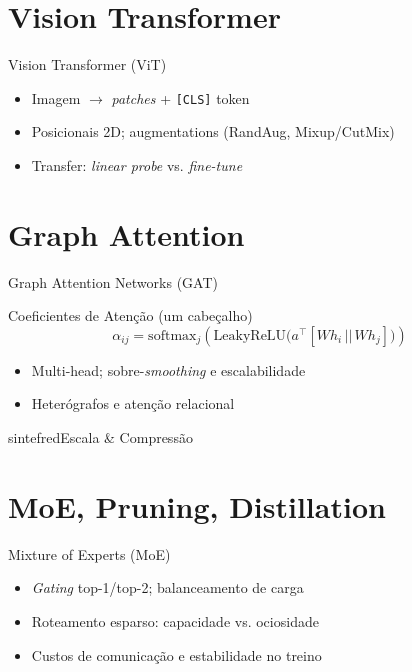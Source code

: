 \documentclass{beamer}
\begin{document}
\section{Vision Transformer}
\begin{frame}{Vision Transformer (ViT)}
\begin{itemize}[<+->]
  \item Imagem $\rightarrow$ \textit{patches} + \texttt{[CLS]} token
  \item Posicionais 2D; augmentations (RandAug, Mixup/CutMix)
  \item Transfer: \textit{linear probe} vs. \textit{fine-tune}
\end{itemize}
\end{frame}

\section{Graph Attention}
\begin{frame}{Graph Attention Networks (GAT)}
\begin{block}{Coeficientes de Atenção (um cabeçalho)}
\small
\[
\alpha_{ij}=\mathrm{softmax}_j\!\left(\mathrm{LeakyReLU}\!\big(a^\top[Wh_i \,||\, Wh_j]\big)\right)
\]
\end{block}
\begin{itemize}[<+->]
  \item Multi-head; sobre-\textit{smoothing} e escalabilidade
  \item Heterógrafos e atenção relacional
\end{itemize}
\end{frame}

\begin{chapter}{sintefred}{Escala \& Compressão}\end{chapter}

\section{MoE, Pruning, Distillation}
\begin{frame}{Mixture of Experts (MoE)}
\begin{itemize}[<+->]
  \item \textit{Gating} top-1/top-2; balanceamento de carga
  \item Roteamento esparso: capacidade vs. ociosidade
  \item Custos de comunicação e estabilidade no treino
\end{itemize}
\end{frame}
\end{document}

